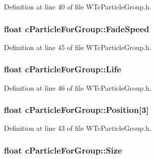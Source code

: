 Definition at line 40 of file WTcParticleGroup.h.

\hypertarget{classc_particle_for_group_a9991442c8b687c6f689fd6002bf7ee62}{
\subsubsection[{FadeSpeed}]{\setlength{\rightskip}{0pt plus 5cm}float {\bf cParticleForGroup::FadeSpeed}}}
\label{classc_particle_for_group_a9991442c8b687c6f689fd6002bf7ee62}


Definition at line 45 of file WTcParticleGroup.h.

\hypertarget{classc_particle_for_group_ab0febcee2beb0b15748540220a433546}{
\subsubsection[{Life}]{\setlength{\rightskip}{0pt plus 5cm}float {\bf cParticleForGroup::Life}}}
\label{classc_particle_for_group_ab0febcee2beb0b15748540220a433546}


Definition at line 46 of file WTcParticleGroup.h.

\hypertarget{classc_particle_for_group_af16135676cbf82e97ad5aab1cc0cc9cc}{
\subsubsection[{Position}]{\setlength{\rightskip}{0pt plus 5cm}float {\bf cParticleForGroup::Position}\mbox{[}3\mbox{]}}}
\label{classc_particle_for_group_af16135676cbf82e97ad5aab1cc0cc9cc}


Definition at line 43 of file WTcParticleGroup.h.

\hypertarget{classc_particle_for_group_a6eb5c1f7faf24e99e75da53f37222105}{
\subsubsection[{Size}]{\setlength{\rightskip}{0pt plus 5cm}float {\bf cParticleForGroup::Size}}}
\label{classc_particle_for_group_a6eb5c1f7faf24e99e75da53f37222105}


